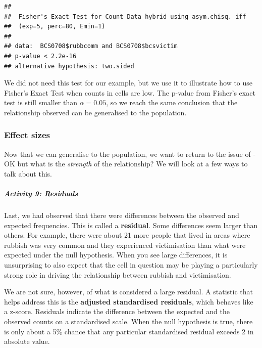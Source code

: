 \documentclass[
]{book}
\newenvironment{Shaded}{\begin{snugshade}}{\end{snugshade}}
\newcommand{\AttributeTok}[1]{\textcolor[rgb]{0.77,0.63,0.00}{#1}}
\newcommand{\CommentTok}[1]{\textcolor[rgb]{0.56,0.35,0.01}{\textit{#1}}}
\newcommand{\ConstantTok}[1]{\textcolor[rgb]{0.00,0.00,0.00}{#1}}
\newcommand{\FloatTok}[1]{\textcolor[rgb]{0.00,0.00,0.81}{#1}}
\newcommand{\FunctionTok}[1]{\textcolor[rgb]{0.00,0.00,0.00}{#1}}
\newcommand{\NormalTok}[1]{#1}
\newcommand{\SpecialCharTok}[1]{\textcolor[rgb]{0.00,0.00,0.00}{#1}}
\begin{document}
\begin{Shaded}
\end{Shaded}

\begin{verbatim}
## 
##  Fisher's Exact Test for Count Data hybrid using asym.chisq. iff
##  (exp=5, perc=80, Emin=1)
## 
## data:  BCS0708$rubbcomm and BCS0708$bcsvictim
## p-value < 2.2e-16
## alternative hypothesis: two.sided
\end{verbatim}

We did not need this test for our example, but we use it to illustrate how to use Fisher's Exact Test when counts in cells are low. The p-value from Fisher's exact test is still smaller than \(\alpha = 0.05\), so we reach the same conclusion that the relationship observed can be generalised to the population.

\hypertarget{effect-sizes}{%
\subsubsection{Effect sizes}\label{effect-sizes}}

Now that we can generalise to the population, we want to return to the issue of - OK but what is the \emph{strength} of the relationship? We will look at a few ways to talk about this.

\hypertarget{activity-9-residuals}{%
\subparagraph{Activity 9: Residuals}\label{activity-9-residuals}}

Last, we had observed that there were differences between the observed and expected frequencies. This is called a \textbf{residual}. Some differences seem larger than others. For example, there were about 21 more people that lived in areas where rubbish was very common and they experienced victimisation than what were expected under the null hypothesis. When you see large differences, it is unsurprising to also expect that the cell in question may be playing a particularly strong role in driving the relationship between rubbish and victimisation.

We are not sure, however, of what is considered a large residual. A statistic that helps address this is the \textbf{adjusted standardised residuals}, which behaves like a z-score. Residuals indicate the difference between the expected and the observed counts on a standardised scale. When the null hypothesis is true, there is only about a 5\% chance that any particular standardised residual exceeds 2 in absolute value.
\end{document}
